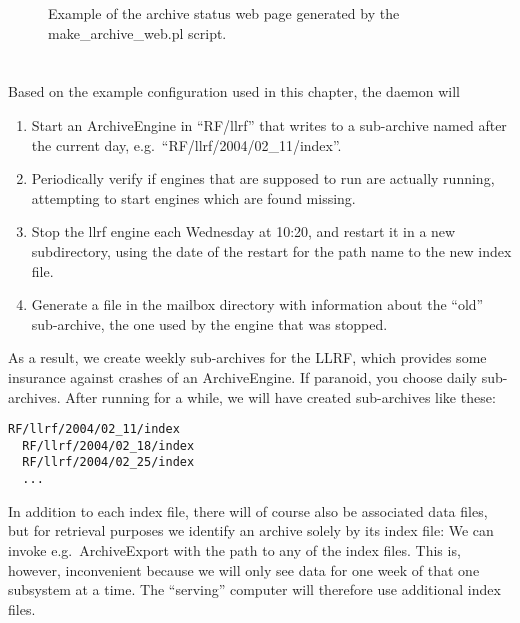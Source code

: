 \begin{figure}[htb]
\begin{center}
\end{center}
\caption{\label{fig:archcfgstat}Example of the archive status web page
  generated by the make\_archive\_web.pl script.}
\end{figure}

\section{}
Based on the example configuration used in this chapter,
the daemon will 
\begin{enumerate}
\item Start an ArchiveEngine in ``RF/llrf'' that writes to
      a sub-archive named after the current day,
      e.g.\ ``RF/llrf/2004/02\_11/index''.
\item Periodically verify if engines that are supposed to run are
      actually running, attempting to start engines which are found missing.
\item Stop the llrf engine each Wednesday at 10:20, and restart it in
      a new subdirectory, using the date of the restart for the path
      name to the new index file.
\item Generate a file in the mailbox directory with information about
      the ``old'' sub-archive, the one used by the engine that was
      stopped.
\end{enumerate}

\noindent As a result, we create weekly sub-archives for the LLRF,
which provides some insurance against crashes of an
ArchiveEngine. If paranoid, you choose daily sub-archives.
After running for a while, we will have created sub-archives like these:
\begin{lstlisting}[frame=none,keywordstyle=\sffamily]
  RF/llrf/2004/02_11/index
  RF/llrf/2004/02_18/index
  RF/llrf/2004/02_25/index
  ...
\end{lstlisting}
\noindent In addition to each index file, there will of course also be
associated data files, but for retrieval purposes we identify an
archive solely by its index file: We can invoke e.g.\ ArchiveExport
with the path to any of the index files. This is, however,
inconvenient because we will only see data for one week of that one
subsystem at a time.
The ``serving'' computer will therefore use additional index files.

